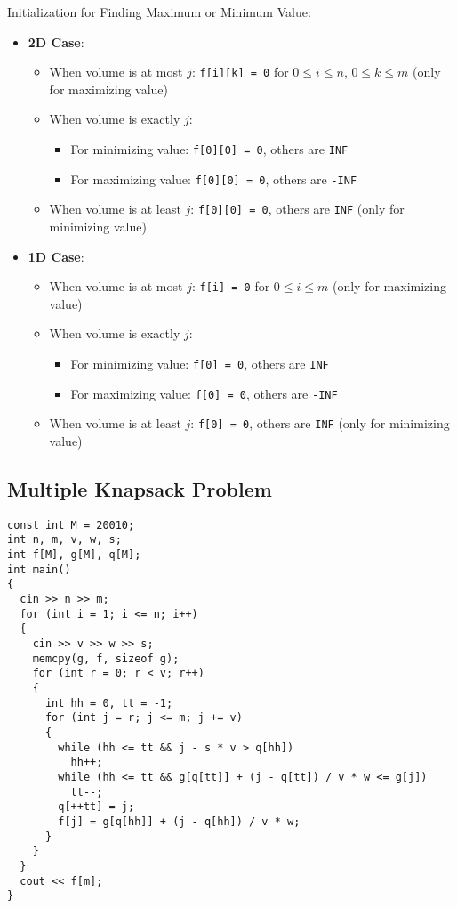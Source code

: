 Initialization for Finding Maximum or Minimum Value:

\begin{itemize}
    \item \textbf{2D Case}:
    \begin{itemize}
      \item When volume is at most $j$: \texttt{f[i][k] = 0} for $0 \leq i \leq n$, $0 \leq k \leq m$ (only for maximizing value)
      \item When volume is exactly $j$:
      \begin{itemize}
        \item For minimizing value: \texttt{f[0][0] = 0}, others are \texttt{INF}
        \item For maximizing value: \texttt{f[0][0] = 0}, others are \texttt{-INF}
      \end{itemize}
      \item When volume is at least $j$: \texttt{f[0][0] = 0}, others are \texttt{INF} (only for minimizing value)
    \end{itemize}

    \item \textbf{1D Case}:
    \begin{itemize}
      \item When volume is at most $j$: \texttt{f[i] = 0} for $0 \leq i \leq m$ (only for maximizing value)
      \item When volume is exactly $j$:
      \begin{itemize}
        \item For minimizing value: \texttt{f[0] = 0}, others are \texttt{INF}
        \item For maximizing value: \texttt{f[0] = 0}, others are \texttt{-INF}
      \end{itemize}
      \item When volume is at least $j$: \texttt{f[0] = 0}, others are \texttt{INF} (only for minimizing value)
    \end{itemize}
\end{itemize}

\subsection{Multiple Knapsack Problem}
\begin{lstlisting}
const int M = 20010;
int n, m, v, w, s;
int f[M], g[M], q[M];
int main()
{
  cin >> n >> m;
  for (int i = 1; i <= n; i++)
  {
    cin >> v >> w >> s;
    memcpy(g, f, sizeof g);
    for (int r = 0; r < v; r++)
    {
      int hh = 0, tt = -1;
      for (int j = r; j <= m; j += v)
      {
        while (hh <= tt && j - s * v > q[hh])
          hh++;
        while (hh <= tt && g[q[tt]] + (j - q[tt]) / v * w <= g[j])
          tt--;
        q[++tt] = j;
        f[j] = g[q[hh]] + (j - q[hh]) / v * w;
      }
    }
  }
  cout << f[m];
}
\end{lstlisting}
